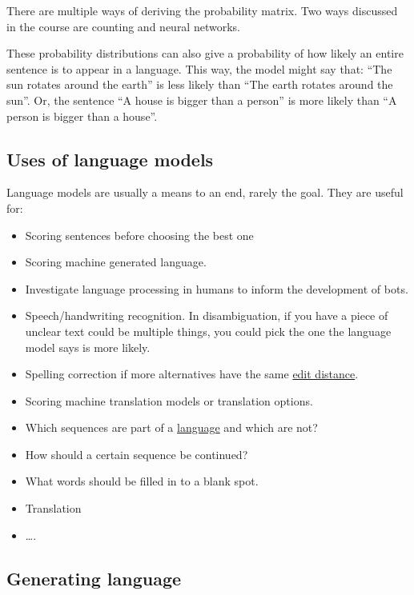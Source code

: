 \documentclass[
  11pt,
  british,
]{article}
\providecommand{\tightlist}{%
  \setlength{\itemsep}{0pt}\setlength{\parskip}{0pt}}
\begin{document}
There are multiple ways of deriving the probability matrix. Two ways
discussed in the course are counting and neural networks.

These probability distributions can also give a probability of how
likely an entire sentence is to appear in a language. This way, the
model might say that: ``The sun rotates around the earth'' is less
likely than ``The earth rotates around the sun''. Or, the sentence ``A
house is bigger than a person'' is more likely than ``A person is bigger
than a house''.

\hypertarget{uses-of-language-models}{%
\subsection{Uses of language models}\label{uses-of-language-models}}

Language models are usually a means to an end, rarely the goal. They are
useful for:

\begin{itemize}
\tightlist
\item
  Scoring sentences before choosing the best one
\item
  Scoring machine generated language.
\item
  Investigate language processing in humans to inform the development of
  bots.
\item
  Speech/handwriting recognition. In disambiguation, if you have a piece
  of unclear text could be multiple things, you could pick the one the
  language model says is more likely.
\item
  Spelling correction if more alternatives have the same
  \href{../Languages/Edit\%20distance.md}{edit distance}.
\item
  Scoring machine translation models or translation options.
\item
  Which sequences are part of a
  \href{../Languages/Languages.md}{language} and which are not?
\item
  How should a certain sequence be continued?
\item
  What words should be filled in to a blank spot.
\item
  Translation
\item
  \ldots.
\end{itemize}

\hypertarget{generating-language}{%
\subsection{Generating language}\label{generating-language}}
\end{document}
